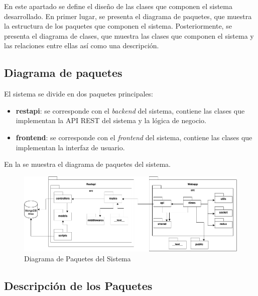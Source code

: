 En este apartado se define el diseño de las clases que componen el sistema desarrollado. 
En primer lugar, se presenta el diagrama de paquetes, que muestra la estructura de los paquetes que componen el sistema.
Posteriormente, se presenta el diagrama de clases, que muestra las clases que componen el sistema y las relaciones entre ellas así como una descripción.

\subsection{Diagrama de paquetes} 
El sistema se divide en dos paquetes principales:
\begin{itemize}
    \item \textbf{restapi}: se corresponde con el \textit{backend} del sistema, contiene las clases que implementan la API REST del sistema y la lógica de negocio.
    \item \textbf{frontend}: se corresponde con el \textit{frontend} del sistema, contiene las clases que implementan la interfaz de usuario.
\end{itemize}

En la  se muestra el diagrama de paquetes del sistema.
\begin{figure}[H]
    \hypertarget{fig:6_5_Diagrama-Paquetes}{}
    \centering
    \includegraphics[width=0.8\linewidth]{figures/6-Analisis/6-Clases/6_5-vista_general-paquetes.png}
    \caption{Diagrama de Paquetes del Sistema}
    \label{fig:6_5_Diagrama-Paquetes}
\end{figure}

\subsection{Descripción de los Paquetes}
